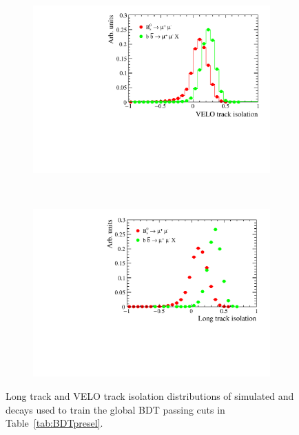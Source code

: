 \begin{figure}[htbp]
    \centering
    \begin{subfigure}[b]{0.4\textwidth}
        \includegraphics[width=\textwidth]{./Figs/Selection/iso_velo_simulation_all.pdf}
    \end{subfigure}
    ~ %
    \begin{subfigure}[b]{0.4\textwidth}
       \includegraphics[width=\textwidth]{./Figs/Selection/iso_lt_sim_all.pdf}
    \end{subfigure}
    \caption{Long track and VELO track isolation distributions of simulated \bsmumu and \bbbarmumux decays used to train the global BDT passing cuts in Table~\ref{tab:BDTpresel}.}
    \label{fig:Isolations}
\end{figure}

